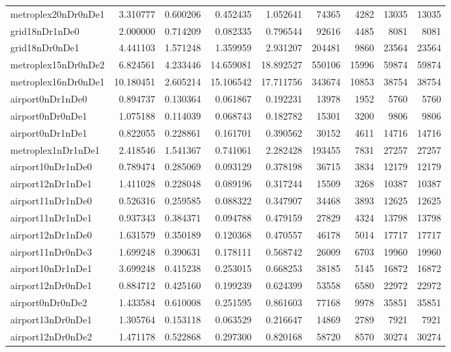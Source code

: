 \begin{longtable}{|l|r|r|r|r|r|r|r|r|}
metroplex20nDr0nDe1 & 3.310777 & 0.600206 & 0.452435 & 1.052641 & 74365 & 4282 & 13035 & 13035 \\
grid18nDr1nDe0 & 2.000000 & 0.714209 & 0.082335 & 0.796544 & 92616 & 4485 & 8081 & 8081 \\
grid18nDr0nDe1 & 4.441103 & 1.571248 & 1.359959 & 2.931207 & 204481 & 9860 & 23564 & 23564 \\
metroplex15nDr0nDe2 & 6.824561 & 4.233446 & 14.659081 & 18.892527 & 550106 & 15996 & 59874 & 59874 \\
metroplex16nDr0nDe1 & 10.180451 & 2.605214 & 15.106542 & 17.711756 & 343674 & 10853 & 38754 & 38754 \\
airport0nDr1nDe0 & 0.894737 & 0.130364 & 0.061867 & 0.192231 & 13978 & 1952 & 5760 & 5760 \\
airport0nDr0nDe1 & 1.075188 & 0.114039 & 0.068743 & 0.182782 & 15301 & 3200 & 9806 & 9806 \\
airport0nDr1nDe1 & 0.822055 & 0.228861 & 0.161701 & 0.390562 & 30152 & 4611 & 14716 & 14716 \\
metroplex1nDr1nDe1 & 2.418546 & 1.541367 & 0.741061 & 2.282428 & 193455 & 7831 & 27257 & 27257 \\
airport10nDr1nDe0 & 0.789474 & 0.285069 & 0.093129 & 0.378198 & 36715 & 3834 & 12179 & 12179 \\
airport12nDr1nDe1 & 1.411028 & 0.228048 & 0.089196 & 0.317244 & 15509 & 3268 & 10387 & 10387 \\
airport11nDr1nDe0 & 0.526316 & 0.259585 & 0.088322 & 0.347907 & 34468 & 3893 & 12625 & 12625 \\
airport11nDr1nDe1 & 0.937343 & 0.384371 & 0.094788 & 0.479159 & 27829 & 4324 & 13798 & 13798 \\
airport12nDr1nDe0 & 1.631579 & 0.350189 & 0.120368 & 0.470557 & 46178 & 5014 & 17717 & 17717 \\
airport11nDr0nDe3 & 1.699248 & 0.390631 & 0.178111 & 0.568742 & 26009 & 6703 & 19960 & 19960 \\
airport10nDr1nDe1 & 3.699248 & 0.415238 & 0.253015 & 0.668253 & 38185 & 5145 & 16872 & 16872 \\
airport12nDr0nDe1 & 0.884712 & 0.425160 & 0.199239 & 0.624399 & 53558 & 6580 & 22972 & 22972 \\
airport0nDr0nDe2 & 1.433584 & 0.610008 & 0.251595 & 0.861603 & 77168 & 9978 & 35851 & 35851 \\
airport13nDr0nDe1 & 1.305764 & 0.153118 & 0.063529 & 0.216647 & 14869 & 2789 & 7921 & 7921 \\
airport12nDr0nDe2 & 1.471178 & 0.522868 & 0.297300 & 0.820168 & 58720 & 8570 & 30274 & 30274 \\

\end{longtable}
